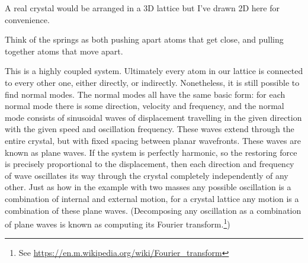 \documentclass[a4paper]{article}
\begin{document}
\begin{center}
\end{center}


A real crystal would be arranged in a 3D lattice but I've drawn 2D here for convenience.

Think of the springs as both pushing apart atoms that get close, and pulling together atoms that move apart.

This is a highly coupled system.
Ultimately every atom in our lattice is connected to every other one, either directly, or indirectly.
Nonetheless, it is still possible to find normal modes.
The normal modes all have the same basic form:
for each normal mode there is some direction, velocity and frequency, and the normal mode consists of sinusoidal waves of displacement travelling in the given direction with the given speed and oscillation frequency.
These waves extend through the entire crystal, but with fixed spacing between planar wavefronts.
These waves are known as plane waves.
If the system is perfectly harmonic, so the restoring force is precisely proportional to the displacement, then each direction and frequency of wave oscillates its way through the crystal completely independently of any other.
Just as how in the example with two masses any possible oscillation is a combination of internal and external motion, for a crystal lattice any motion is a combination of these plane waves. (Decomposing any oscillation as a combination of plane waves is known as computing its Fourier transform.\footnote{See \url{https://en.m.wikipedia.org/wiki/Fourier_transform}})
\end{document}
